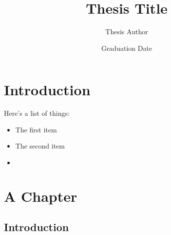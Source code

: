 \documentclass{ucetd}
\title{Thesis Title}
\author{Thesis Author}
\date{Graduation Date}
\begin{document}
\maketitle

\makecopyright
\makededication
\makeepigraph


\tableofcontents
\listoffigures
\listoftables

\acknowledgments

\abstract

\mainmatter

\chapter{Introduction}

Here's a list of things:
\begin{itemize}
\item The first item
\item The second item
\item \lipsum*[4]

\lipsum*[5]
\end{itemize}

\chapter{A Chapter}
\section{Introduction}


%
%
\end{document}
